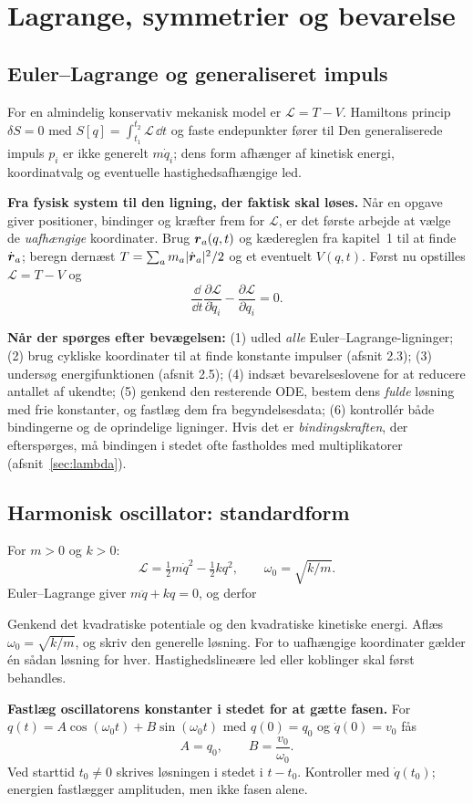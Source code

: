 \clearpage\section{Lagrange, symmetrier og bevarelse}
\subsection{Euler--Lagrange og generaliseret impuls}
For en almindelig konservativ mekanisk model er $\mathcal L=T-V$. Hamiltons princip $\delta S=0$ med $S[q]=\int_{t_1}^{t_2}\mathcal L\,\dd t$ og faste endepunkter fører til
Den generaliserede impuls $p_i$ er ikke generelt $m\dot q_i$; dens form afhænger af kinetisk energi, koordinatvalg og eventuelle hastighedsafhængige led.

\textbf{Fra fysisk system til den ligning, der faktisk skal løses.}
Når en opgave giver positioner, bindinger og kræfter frem for $\mathcal L$, er det første arbejde at vælge de \emph{uafhængige} koordinater. Brug $\boldsymbol{r}_a(q,t)$ og kædereglen fra kapitel~1 til at finde $\dot{\boldsymbol{r}}_a$; beregn dernæst $T=\sum_a m_a|\dot{\boldsymbol{r}}_a|^2/2$ og et eventuelt $V(q,t)$. Først nu opstilles $\mathcal L=T-V$ og
\[
\frac{\dd}{\dd t}\frac{\partial\mathcal L}{\partial\dot q_i}
-\frac{\partial\mathcal L}{\partial q_i}=0.
\]
\begin{method}\textbf{Når der spørges efter bevægelsen:}
(1) udled \emph{alle} Euler--Lagrange-ligninger;
(2) brug cykliske koordinater til at finde konstante impulser (afsnit 2.3);
(3) undersøg energifunktionen (afsnit 2.5);
(4) indsæt bevarelseslovene for at reducere antallet af ukendte;
(5) genkend den resterende ODE, bestem dens \emph{fulde} løsning med frie konstanter, og fastlæg dem fra begyndelsesdata;
(6) kontrollér både bindingerne og de oprindelige ligninger.
Hvis det er \emph{bindingskraften}, der efterspørges, må bindingen i stedet ofte fastholdes med multiplikatorer (afsnit~\ref{sec:lambda}).\end{method}

\subsection{Harmonisk oscillator: standardform}
For $m>0$ og $k>0$:
\[\mathcal L=\tfrac12m\dot q^2-\tfrac12kq^2,\qquad \omega_0=\sqrt{k/m}.\]
Euler--Lagrange giver $m\ddot q+kq=0$, og derfor
\begin{method}Genkend det kvadratiske potentiale og den kvadratiske kinetiske energi. Aflæs $\omega_0=\sqrt{k/m}$, og skriv den generelle løsning. For to uafhængige koordinater gælder én sådan løsning for hver. Hastighedslineære led eller koblinger skal først behandles.\end{method}
\textbf{Fastlæg oscillatorens konstanter i stedet for at gætte fasen.}
For $q(t)=A\cos(\omega_0t)+B\sin(\omega_0t)$ med $q(0)=q_0$ og $\dot q(0)=v_0$ fås
\[
A=q_0,\qquad B=\frac{v_0}{\omega_0}.
\]
Ved starttid $t_0\ne0$ skrives løsningen i stedet i $t-t_0$. Kontroller med $\dot q(t_0)$; energien fastlægger amplituden, men ikke fasen alene.

